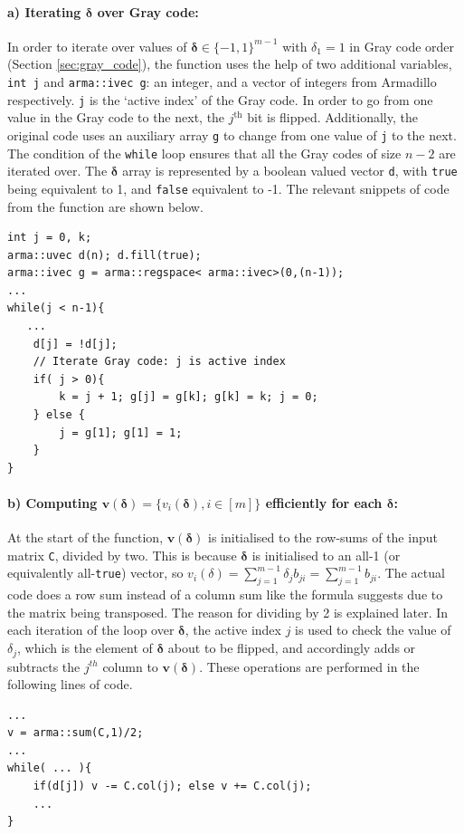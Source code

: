 \documentclass[11pt]{article}
\theoremstyle{theorem}
\theoremstyle{remark}
\theoremstyle{plain}
\theoremstyle{definition}
\begin{document}
\paragraph{a) Iterating $\mathbf{\delta}$ over Gray code:} In order to iterate over values of $\mathbf{\delta} \in \{-1, 1\}^{m-1}$ with $\delta_1 = 1$ in Gray code order (Section \ref{sec:gray_code}), the function uses the help of two additional variables, \texttt{int j} and \texttt{arma::ivec g}: an integer, and a vector of integers from Armadillo respectively. \texttt{j} is the `active index' of the Gray code. In order to go from one value in the Gray code to the next, the $j^\text{th}$ bit is flipped. Additionally, the original code uses an auxiliary array \texttt{g} to change from one value of  \texttt{j} to the next. The condition of the \texttt{while} loop ensures that all the Gray codes of size $n-2$ are iterated over. The $\mathbf{\delta}$ array is represented by a boolean valued vector \texttt{d}, with \texttt{true} being equivalent to 1, and \texttt{false} equivalent to -1.
The relevant snippets of code from the function are shown below.
\begin{verbatim}
int j = 0, k;
arma::uvec d(n); d.fill(true);
arma::ivec g = arma::regspace< arma::ivec>(0,(n-1));
...
while(j < n-1){
   ...
    d[j] = !d[j];
    // Iterate Gray code: j is active index
    if( j > 0){
        k = j + 1; g[j] = g[k]; g[k] = k; j = 0;
    } else {
        j = g[1]; g[1] = 1;
    }
}
\end{verbatim}

\paragraph{b) Computing $\mathbf{v}(\mathbf{\delta}) = \{v_i (\mathbf{\delta}), i \in [m]\}$ efficiently for each $\mathbf{\delta}$:} At the start of the function, $\mathbf{v}(\mathbf{\delta})$ is initialised to the row-sums of the input matrix \texttt{C}, divided by two. This is because $\mathbf{\delta}$ is initialised to an all-1 (or equivalently all-\texttt{true}) vector, so $v_i (\delta) = \sum_{j=1}^{m-1} \delta_j b_{ji} =  \sum_{j=1}^{m-1} b_{ji}$. The actual code does a row sum instead of a column sum like the formula suggests due to the matrix being transposed. The reason for dividing by 2 is explained later. In each iteration of the loop over $\mathbf{\delta}$, the active index $j$ is used to check the value of $\delta_j$, which is the element of $\mathbf{\delta}$ about to be flipped, and accordingly adds or subtracts the $j^{th}$ column to $\mathbf{v}(\mathbf{\delta})$. These operations are performed in the following lines of code.
\begin{verbatim}
...
v = arma::sum(C,1)/2;
...
while( ... ){
    if(d[j]) v -= C.col(j); else v += C.col(j);
    ...
}
\end{verbatim}
\end{document}
